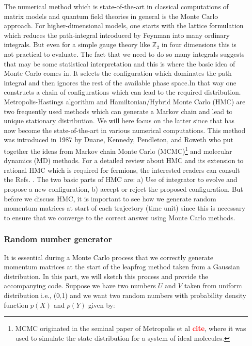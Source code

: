 \documentclass[11pt]{article}
\newcommand{\TODO}[1]{\textcolor{red}{{\bf #1}}}
\begin{document}
The numerical method which is state-of-the-art in classical computations 
of matrix models and quantum field theories in general is the Monte Carlo approach.
For higher-dimensional models, one starts with the lattice formulation which reduces the 
path-integral introduced by Feynman into many ordinary integrals. But even for a simple
gauge theory like $\mathbb{Z}_{2}$ in four dimensions this is not practical to evaluate. 
The fact that we need to do so many integrals suggests that may be some statistical 
interpretation and this is where the basic idea of Monte Carlo comes in. It selects the 
configuration which dominates the path integral and then ignores the rest of the available
phase space.In that way one constructs a chain of configurations which can lead to the 
required distribution. Metropolis-Hastings algorithm and Hamiltonian/Hybrid Monte Carlo (HMC) 
are two frequently used methods which 
can generate a Markov chain and lead to unique stationary distribution. 
We will here focus on the latter since that has now become the state-of-the-art in 
various numerical computations. This method was introduced in 1987 by 
Duane, Kennedy, Pendleton, and Roweth who put together the ideas from
Markov chain Monte Carlo (MCMC)\footnote{MCMC originated in the seminal paper of Metropolis et al
\TODO{cite}, where it was used to simulate the state distribution for a system of ideal molecules.} 
and molecular dynamics (MD) methods. For a detailed review about HMC and its extension to
rational HMC which is required for fermions, the interested readers can 
consult the Refs. \cite{Hanada:2018fnp}. The two basic parts of HMC are: 
a) Use of integrator to evolve and propose a new configuration, b) accept or reject
the proposed configuration. But before we discuss HMC, it is important to see how we generate random momentum matrices at start of each trajectory (time unit) since this is necessary to ensure that we converge to the correct answer using Monte Carlo methods. 


\subsubsection{Random number generator}  

It is essential during a Monte Carlo process that we correctly generate momentum matrices at the start of the leapfrog method taken from a Gaussian distribution. In this part, we will sketch this process and provide the accompanying code. Suppose we have two numbers $U$ and $V$ taken from uniform distribution i.e., (0,1)  and we want two random numbers with probability density function $p(X)$ and $p(Y)$ given by:
\end{document}
